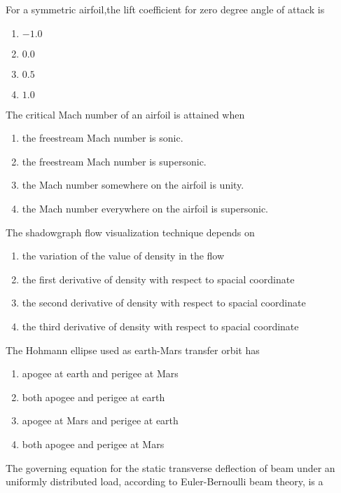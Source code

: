     \item For a symmetric airfoil,the lift coefficient for zero degree angle of attack is
    \begin{enumerate}
        \item $-1.0$
        \item $0.0$
        \item $0.5$
        \item $1.0$
    \end{enumerate}
    \item The critical Mach number of an airfoil is attained when
    \begin{enumerate}
        \item the freestream Mach number is sonic.
        \item the freestream Mach number is supersonic.
        \item the Mach number somewhere on the airfoil is unity.
        \item the Mach number everywhere on the airfoil is supersonic.
    \end{enumerate}
    \item The shadowgraph flow visualization technique depends on
        \begin{enumerate}
            \item the variation of the value of density in the flow
            \item the first derivative of density with respect to spacial coordinate
            \item the second derivative of density with respect to spacial coordinate
            \item the third derivative of density with respect to spacial coordinate
        \end{enumerate}
    \item The Hohmann ellipse used as earth-Mars transfer orbit has
    \begin{enumerate}
        \item apogee at earth and perigee at Mars
        \item both apogee and perigee at earth
        \item apogee at Mars and perigee at earth
        \item both apogee and perigee at Mars
    \end{enumerate}
    \item The governing equation for the static transverse deflection of beam under an uniformly distributed load, according to Euler-Bernoulli  beam theory, is a 
